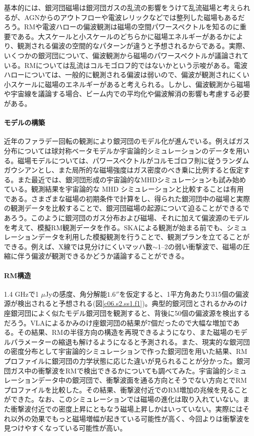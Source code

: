 基本的には、銀河団磁場は銀河団ガスの乱流の影響をうけて乱流磁場と考えられるが、AGNからのアウトフローや電波レリックなどでは整列した磁場もあるだろう。RMや電波ハローの偏波観測は磁場の空間パワースペクトルを知るのに重要である。大スケールと小スケールのどちらかに磁場エネルギーがあるかにより、観測される偏波の空間的なパターンが違うと予想されるからである。実際、いくつかの銀河団について、偏波観測から磁場のパワースペクトルが議論されている。RMについては乱流はコルモゴロフ的ではないかという示唆がある\citep{2008A&A...483..699G}。電波ハローについては、一般的に観測される偏波は弱いので、偏波が観測されにくい小スケールに磁場のエネルギーがあると考えられる。しかし、偏波観測から磁場や宇宙線を議論する場合、ビーム内での平均化や偏波解消の影響も考慮する必要がある。

\paragraph{モデルの構築}

近年のファラデー回転の観測により銀河団のモデル化が進んでいる。例えばガス分布については球対称ベータモデルか宇宙論的シミュレーションのデータを用いる。磁場モデルについては、パワースペクトルがコルモゴロフ則に従うランダムガウシアンとし、また局所的な磁場強度はガス密度のべき乗に比例すると仮定する。また最近では、銀河団形成の宇宙論的なMHDシミュレーションも試み始めている。観測結果を宇宙論的な MHD シミュレーションと比較することは有用である。さまざまな磁場の初期条件で計算をし、得られた銀河団中の磁場と実際の観測データを比較することで、銀河団磁場の起源について迫ることができるであろう。このように銀河団のガス分布および磁場、それに加えて偏波源のモデルを考えて、模擬RM観測データを作る。SKAによる観測が始まる前でも、シミュレーションデータを利用した模擬観測を行うことで、観測プランを立てることができる。例えば、X線では見分けにくいマッハ数$\sim $1--2の弱い衝撃波で、磁場の圧縮に伴う偏波が観測できるかどうか議論することができる。

\paragraph{RM構造} 

1.4 GHzで1 $\mu$Jyの感度、角分解能$1.6''$を仮定すると、1平方角あたり315個の偏波源が検出されると予想される(図\ref{c06.s2.ss1.f1})。典型的銀河団とされるかみのけ座銀河団によく似たモデル銀河団を観測すると、背後に50個の偏波源を検出するだろう。VLAによるかみのけ座銀河団の結果が7個だったので大幅な増加である。その結果、RMの半径方向の構造を再現できるようになり、また磁場のモデルパラメーターの縮退も解けるようになると予測される。また、現実的な銀河団の密度分布として宇宙論的シミュレーション\citep{2010NewA...15..695V}で作った銀河団を用いた結果、RMプロファイルに銀河団の力学状態に応じた違いが見られることが分かった。銀河団ガス中の衝撃波をRMで検出できるかについても調べてみた。宇宙論的シミュレーションデータ中の銀河団で、衝撃波面を通る方向とそうでない方向とでRMプロファイルを比較した。その結果、衝撃波付近でのRM増加の兆候を見ることができた。なお、このシミュレーションでは磁場の進化は取り入れていない。また衝撃波付近での密度上昇にともなう磁場上昇しかはいっていない。実際にはそれ以外の効果でもっと磁場増幅が起きている可能性が高く、今回よりは衝撃波を見つけやすくなっている可能性が高い。

